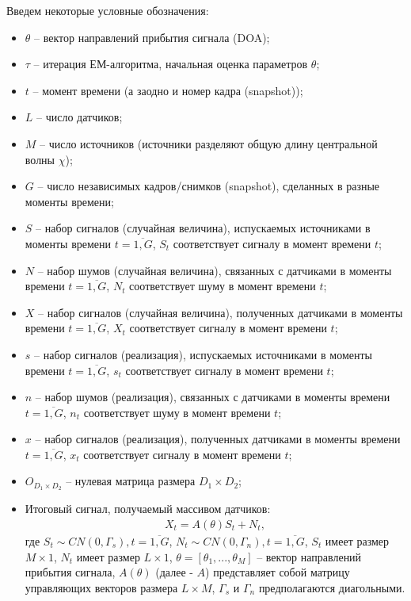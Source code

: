 \documentclass[11pt]{article}
\begin{document}
\begin{center}
\fontsize{20}{23}\selectfont {}
\end{center}
Введем некоторые условные обозначения:
\begin{itemize}
\item
$\theta$ -- вектор направлений прибытия сигнала (DOA);
\item
$\tau$ -- итерация ЕМ-алгоритма, начальная оценка параметров $\theta$;
\item
$t$ -- момент времени (а заодно и номер кадра (snapshot));
\item
$L$ -- число датчиков;
\item
$M$ -- число источников (источники разделяют общую длину центральной волны $\chi$);
\item
$G$ -- число независимых кадров/снимков (snapshot), сделанных в разные моменты времени;
\item
$S$ -- набор сигналов (случайная величина), испускаемых источниками в моменты времени $t=\overline{1,G}$, $S_t$ соответствует сигналу в момент времени $t$;
\item
$N$ -- набор шумов (случайная величина), связанных с датчиками в моменты времени $t=\overline{1,G}$, $N_t$ соответствует шуму в момент времени $t$;
\item
$X$ -- набор сигналов (случайная величина), полученных датчиками в моменты времени $t=\overline{1,G}$, $X_t$ соответствует сигналу в момент времени $t$;
\item
$s$ -- набор сигналов (реализация), испускаемых источниками в моменты времени $t=\overline{1,G}$, $s_t$ соответствует сигналу в момент времени $t$;
\item
$n$ -- набор шумов (реализация), связанных с датчиками в моменты времени $t=\overline{1,G}$, $n_t$ соответствует шуму в момент времени $t$;
\item
$x$ -- набор сигналов (реализация), полученных датчиками в моменты времени $t=\overline{1,G}$, $x_t$ соответствует сигналу в момент времени $t$;
\item
$O_{D_1 \times D_2}$ -- нулевая матрица размера $D_1 \times D_2$;
\item
Итоговый сигнал, получаемый массивом датчиков:
\begin{equation}
\begin{gathered}
X_t=A(\theta)S_t+N_t,
\end{gathered}
\end{equation}
где $S_t \sim CN(0,\Gamma_s),t=\overline{1,G}$, $N_t \sim CN(0,\Gamma_n), t=\overline{1,G}$, $S_t$ имеет размер $M \times 1$,  $N_t$ имеет размер $L \times 1$, $\theta=[\theta_1,...,\theta_M]$ -- вектор направлений прибытия сигнала, $A(\theta)$ (далее - $A$) представляет собой матрицу управляющих векторов размера $L \times M$, $\Gamma_s$ и $\Gamma_n$ предполагаются диагольными.

\end{itemize}
\end{document}
